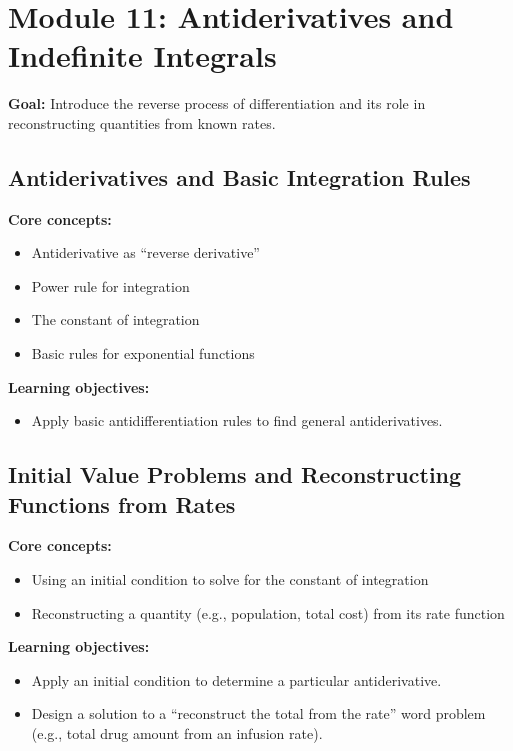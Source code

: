 \documentclass{article}
\begin{document}
\section{Module 11: Antiderivatives and Indefinite Integrals}
\textbf{Goal:} Introduce the reverse process of differentiation and its role in reconstructing quantities from known rates.

\subsection{Antiderivatives and Basic Integration Rules}
\textbf{Core concepts:}
\begin{itemize}[leftmargin=*]
  \item Antiderivative as ``reverse derivative''
  \item Power rule for integration
  \item The constant of integration
  \item Basic rules for exponential functions
\end{itemize}
\textbf{Learning objectives:}
\begin{itemize}[leftmargin=*]
  \item Apply basic antidifferentiation rules to find general antiderivatives.
\end{itemize}

\subsection{Initial Value Problems and Reconstructing Functions from Rates}
\textbf{Core concepts:}
\begin{itemize}[leftmargin=*]
  \item Using an initial condition to solve for the constant of integration
  \item Reconstructing a quantity (e.g., population, total cost) from its rate function
\end{itemize}
\textbf{Learning objectives:}
\begin{itemize}[leftmargin=*]
  \item Apply an initial condition to determine a particular antiderivative.
  \item Design a solution to a ``reconstruct the total from the rate'' word problem (e.g., total drug amount from an infusion rate).
\end{itemize}
\end{document}
